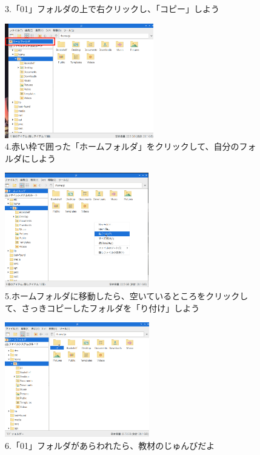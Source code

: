 \documentclass[a4paper,12pt]{jarticle}
\begin{document}
\begin{figure}
\begin{minipage}{\textwidth}
\begin{minipage}{0.45\linewidth}
      3.「01」フォルダの上で右クリックし、「コピー」しよう
    \end{minipage}
    \hfill
    \vspace{20pt}
    \begin{minipage}{0.45\linewidth}
      \includegraphics[width=\linewidth,height=5cm]{textbook-img1013.png}\\
      4.赤い枠で囲った「ホームフォルダ」をクリックして、自分のフォルダにしよう
    \end{minipage}    \begin{minipage}{0.45\linewidth}
      \includegraphics[width=\linewidth,height=5cm]{textbook-img1014.png}\\
      5.ホームフォルダに移動したら、空いているところをクリックして、さっきコピーしたフォルダを「り付け」しよう
    \end{minipage}
    \hfill
    \vspace{20pt}
    \begin{minipage}{0.45\linewidth}
      \includegraphics[width=\linewidth,height=5cm]{textbook-img1015.png}\\
      6.「01」フォルダがあらわれたら、教材のじゅんびだよ
    \end{minipage}

  \end{minipage}

  \bigskip

\end{figure}
\end{document}
